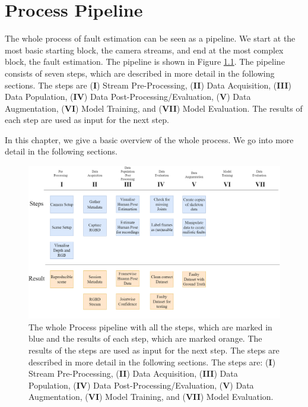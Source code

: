 \chapter{Process Pipeline}

The whole process of fault estimation can be seen as a pipeline. We start at the most basic starting block, the camera streams, and end at the most complex block, the fault estimation. The pipeline is shown in Figure \ref{fig:process_pipeline}. The pipeline consists of seven steps, which are described in more detail in the following sections. The steps are (\textbf{I}) Stream Pre-Processing, (\textbf{II}) Data Acquisition, (\textbf{III}) Data Population, (\textbf{IV}) Data Post-Processing/Evaluation, (\textbf{V}) Data Augmentation, (\textbf{VI}) Model Training, and (\textbf{VII}) Model Evaluation. The results of each step are used as input for the next step.

In this chapter, we give a basic overview of the whole process. We go into more detail in the following sections.

\begin{figure}[ht]
    \centering
    \includegraphics[width=\textwidth]{figures/ProcessingPipeline/ProcessingPipeline.png}
    \caption{The whole Process pipeline with all the steps, which are marked in blue and the results of each step, which are marked orange. The results of the steps are used as input for the next step. The steps are described in more detail in the following sections. The steps are: (\textbf{I}) Stream Pre-Processing, (\textbf{II}) Data Acquisition, (\textbf{III}) Data Population, (\textbf{IV}) Data Post-Processing/Evaluation, (\textbf{V}) Data Augmentation, (\textbf{VI}) Model Training, and (\textbf{VII}) Model Evaluation.}
    \label{fig:process_pipeline}
\end{figure}
